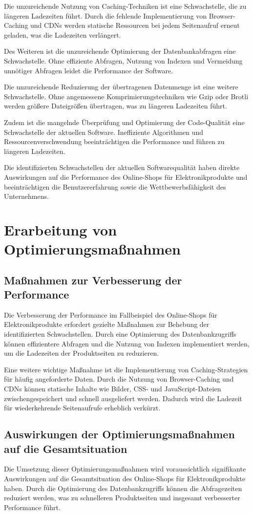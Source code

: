 Die unzureichende Nutzung von Caching-Techniken ist eine Schwachstelle, die zu längeren Ladezeiten führt. Durch die fehlende Implementierung von Browser-Caching und CDNs werden statische Ressourcen bei jedem Seitenaufruf erneut geladen, was die Ladezeiten verlängert.

Des Weiteren ist die unzureichende Optimierung der Datenbankabfragen eine Schwachstelle. Ohne effiziente Abfragen, Nutzung von Indexen und Vermeidung unnötiger Abfragen leidet die Performance der Software.

Die unzureichende Reduzierung der übertragenen Datenmenge ist eine weitere Schwachstelle. Ohne angemessene Komprimierungstechniken wie Gzip oder Brotli werden größere Dateigrößen übertragen, was zu längeren Ladezeiten führt.

Zudem ist die mangelnde Überprüfung und Optimierung der Code-Qualität eine Schwachstelle der aktuellen Software. Ineffiziente Algorithmen und Ressourcenverschwendung beeinträchtigen die Performance und führen zu längeren Ladezeiten.

Die identifizierten Schwachstellen der aktuellen Softwarequalität haben direkte Auswirkungen auf die Performance des Online-Shops für Elektronikprodukte und beeinträchtigen die Benutzererfahrung sowie die Wettbewerbsfähigkeit des Unternehmens.

\section{Erarbeitung von Optimierungsmaßnahmen}
\subsection{Maßnahmen zur Verbesserung der Performance}
Die Verbesserung der Performance im Fallbeispiel des Online-Shops für Elektronikprodukte erfordert gezielte Maßnahmen zur Behebung der identifizierten Schwachstellen. Durch eine Optimierung des Datenbankzugriffs können effizientere Abfragen und die Nutzung von Indexen implementiert werden, um die Ladezeiten der Produktseiten zu reduzieren.

Eine weitere wichtige Maßnahme ist die Implementierung von Caching-Strategien für häufig angeforderte Daten. Durch die Nutzung von Browser-Caching und CDNs können statische Inhalte wie Bilder, CSS- und JavaScript-Dateien zwischengespeichert und schnell ausgeliefert werden. Dadurch wird die Ladezeit für wiederkehrende Seitenaufrufe erheblich verkürzt.

\subsection{Auswirkungen der Optimierungsmaßnahmen auf die Gesamtsituation}
Die Umsetzung dieser Optimierungsmaßnahmen wird voraussichtlich signifikante Auswirkungen auf die Gesamtsituation des Online-Shops für Elektronikprodukte haben. Durch die Optimierung des Datenbankzugriffs können die Abfragezeiten reduziert werden, was zu schnelleren Produktseiten und insgesamt verbesserter Performance führt.

